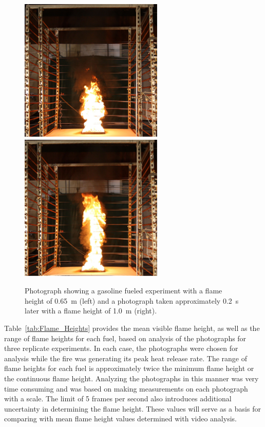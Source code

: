 \documentclass[twoside]{uocthesis}
\begin{document}
{{\begin{figure}
  \includegraphics[width=2.7in]{../Figures/Fig15a}
  \includegraphics[width=2.7in]{../Figures/Fig15b} \\
  \caption[Photographs of the gasoline fire]{Photograph showing a gasoline fueled experiment with a flame height of 0.65~m (left) and a photograph taken approximately 0.2~s later with a flame height of 1.0~m (right).}
  \label{Gasoline_Photos}
\end{figure}


Table~\ref{tab:Flame_Heights} provides the mean visible flame height, as well as the range of flame heights for each fuel, based on analysis of the photographs for three replicate experiments.  In each case, the photographs were chosen for analysis while the fire was generating its peak heat release rate.  The range of flame heights for each fuel is approximately twice the minimum flame height or the continuous flame height. Analyzing the photographs in this manner was very time consuming and was based on making measurements on each photograph with a scale.  The limit of 5 frames per second also introduces additional uncertainty in determining the flame height. These values will serve as a basis for comparing with mean flame height values determined with video analysis.

}}
\end{document}
